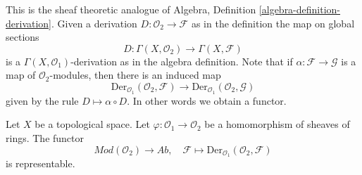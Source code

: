 \noindent
This is the sheaf theoretic analogue of
Algebra, Definition \ref{algebra-definition-derivation}.
Given a derivation $D : \mathcal{O}_2 \to \mathcal{F}$
as in the definition the map on global sections
$$
D : \Gamma(X, \mathcal{O}_2) \longrightarrow \Gamma(X, \mathcal{F})
$$
is a $\Gamma(X, \mathcal{O}_1)$-derivation as in the algebra definition.
Note that if $\alpha : \mathcal{F} \to \mathcal{G}$ is a map of
$\mathcal{O}_2$-modules, then there is an induced map
$$
\text{Der}_{\mathcal{O}_1}(\mathcal{O}_2, \mathcal{F})
\longrightarrow
\text{Der}_{\mathcal{O}_1}(\mathcal{O}_2, \mathcal{G})
$$
given by the rule $D \mapsto \alpha \circ D$. In other words
we obtain a functor.

\begin{lemma}
\label{lemma-universal-module}
Let $X$ be a topological space. Let $\varphi : \mathcal{O}_1 \to \mathcal{O}_2$
be a homomorphism of sheaves of rings. The functor
$$
\textit{Mod}(\mathcal{O}_2) \longrightarrow \textit{Ab}, \quad
\mathcal{F} \longmapsto \text{Der}_{\mathcal{O}_1}(\mathcal{O}_2, \mathcal{F})
$$
is representable.
\end{lemma}

